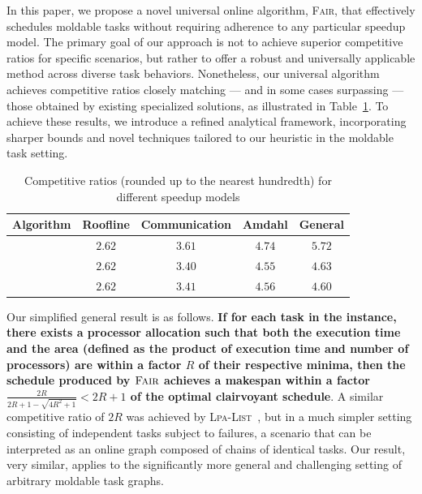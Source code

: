\documentclass{article}
\newcommand\fair{\textsc{Fair}\xspace}
\newcommand\ratio{R\xspace}
\newcommand\lpalist{\textsc{Lpa-List}\xspace}
\begin{document}
In this paper, we propose a novel universal online algorithm, \fair, that effectively schedules moldable tasks without requiring adherence to any particular speedup model. The primary goal of our approach is not to achieve superior competitive ratios for specific scenarios, but rather to offer a robust and universally applicable method across diverse task behaviors. Nonetheless, our universal algorithm achieves competitive ratios closely matching — and in some cases surpassing — those obtained by existing specialized solutions, as illustrated in Table~\ref{tab.all-values}. To achieve these results, we introduce a refined analytical framework, incorporating sharper bounds and novel techniques tailored to our heuristic in the moldable task setting.
\begin{table}[h]
\centering
\caption{Competitive ratios (rounded up to the nearest hundredth) for different speedup models}
\label{tab.all-values}
\begin{tabular}{| c | c | c | c | c |}
\hline
\textbf{Algorithm} & Roofline & Communication & Amdahl & General \\
\hline
\cite{ICPP22} & $2.62$ & $3.61$ & $4.74$ & $5.72$ \\
\hline
\cite{TOPC24} & $2.62$ & $3.40$ & $4.55$ & $4.63$ \\
\hline
[This Paper] & $2.62$ & $3.41$ & $4.56$ & $4.60$ \\
\hline
\end{tabular}
\end{table}

Our simplified general result is as follows. \textbf{If for each task in the instance, there exists a processor allocation such that both the execution time and the area (defined as the product of execution time and number of processors) are within a factor $\ratio$ of their respective minima, then the schedule produced by $\fair$ achieves a makespan within a factor $\frac{2\ratio}{2\ratio+1-\sqrt{4\ratio^2+1}}<2\ratio + 1$ of the optimal clairvoyant schedule}.
 A similar competitive ratio of $2\ratio$ was achieved by \lpalist~\cite{Benoit20_cluster, Benoit21_ieeetc}, but in a much simpler setting consisting of independent tasks subject to failures, a scenario that can be interpreted as an online graph composed of chains of identical tasks. Our result, very similar, applies to the significantly more general and challenging setting of arbitrary moldable task graphs.
\end{document}
